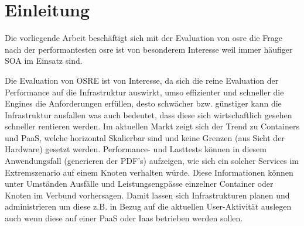 \documentclass[main.tex]{subfiles}
\begin{document}

\chapter{Einleitung}





Die vorliegende Arbeit beschäftigt sich mit der Evaluation von \gls{osre} die Frage nach der performantesten \gls{osre} ist von besonderem Interesse weil immer häufiger \acrfull{SOA} im Einsatz sind.  




Die Evaluation von OSRE ist von Interesse, da sich die reine Evaluation der Performance auf die Infrastruktur auswirkt, umso effizienter und schneller die Engines die Anforderungen erfüllen, desto schwächer bzw. günstiger kann die Infrastruktur ausfallen was auch bedeutet, dass diese sich wirtschaftlich gesehen schneller rentieren werden. Im aktuellen Markt zeigt sich der Trend zu Containers und PaaS, welche horizontal Skalierbar sind und keine Grenzen (aus Sicht der Hardware) gesetzt werden.  Performance- und Lasttests  können in diesem Anwendungsfall (generieren der PDF's) aufzeigen, wie sich ein solcher Services im Extremszenario auf einem Knoten verhalten würde. Diese Informationen können unter Umständen Ausfälle und Leistungsengpässe einzelner Container oder Knoten im Verbund vorhersagen. Damit lassen sich Infrastrukturen planen und administrieren um diese z.B. in Bezug auf die aktuellen User-Aktivität auslegen auch wenn diese auf einer PaaS oder Iaas betrieben werden sollen. 
\end{document}
